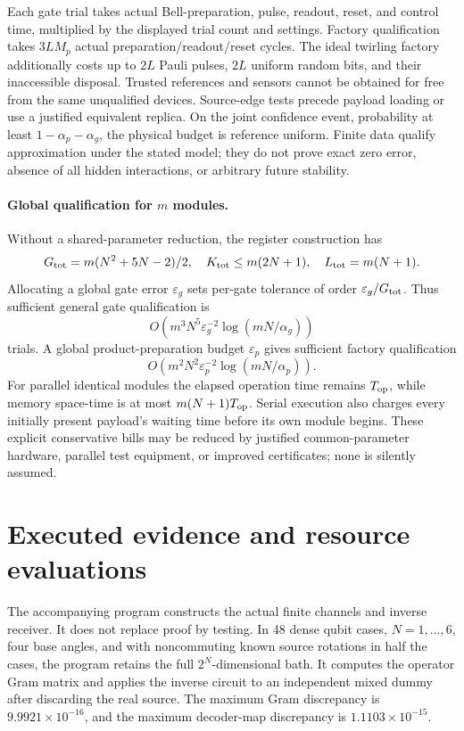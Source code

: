 \documentclass[11pt]{article}
\numberwithin{equation}{section}
\theoremstyle{remark}
\newcommand{\eps}{\varepsilon}
\begin{document}
Each gate trial takes actual Bell-preparation, pulse, readout, reset, and
control time, multiplied by the displayed trial count and settings.
Factory qualification takes \(3LM_p\) actual preparation/readout/reset
cycles. The ideal twirling factory additionally costs up to \(2L\) Pauli
pulses, \(2L\) uniform random bits, and their inaccessible disposal.
Trusted references and sensors cannot be obtained for free from the same
unqualified devices. Source-edge tests precede payload loading or use a
justified equivalent replica.
On the joint confidence event, probability at least
\(1-\alpha_p-\alpha_g\), the physical budget is reference uniform.
Finite data qualify approximation under the stated model; they do not prove
exact zero error, absence of all hidden interactions, or arbitrary future
stability.

\paragraph{Global qualification for \(m\) modules.}
Without a shared-parameter reduction, the register construction has
\[
 G_{\rm tot}=m(N^2+5N-2)/2,\quad
 K_{\rm tot}\le m(2N+1),\quad L_{\rm tot}=m(N+1).
\]
Allocating a global gate error \(\eps_g\) sets per-gate tolerance of order
\(\eps_g/G_{\rm tot}\). Thus sufficient general gate qualification is
\[
 O\!\left(m^3N^5\eps_g^{-2}\log(mN/\alpha_g)\right)
\]
trials. A global product-preparation budget \(\eps_p\) gives sufficient
factory qualification
\[
 O\!\left(m^2N^2\eps_p^{-2}\log(mN/\alpha_p)\right).
\]
For parallel identical modules the elapsed operation time remains
\(T_{\rm op}\), while memory space-time is at most
\(m(N+1)T_{\rm op}\). Serial execution also charges every initially present
payload's waiting time before its own module begins. These explicit
conservative bills may be reduced by justified common-parameter hardware,
parallel test equipment, or improved certificates; none is silently assumed.

\section{Executed evidence and resource evaluations}
\label{sec:evidence}
The accompanying program constructs the actual finite channels and inverse
receiver. It does not replace proof by testing.
In 48 dense qubit cases, \(N=1,\ldots,6\), four base angles, and with
noncommuting known source rotations in half the cases, the program retains
the full \(2^N\)-dimensional bath. It computes the operator Gram matrix and
applies the inverse circuit to an independent mixed dummy after discarding
the real source. The maximum Gram discrepancy is
\(9.9921\times10^{-16}\), and the maximum decoder-map discrepancy is
\(1.1103\times10^{-15}\).
\end{document}
